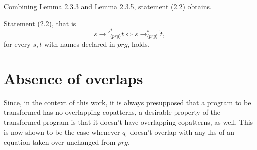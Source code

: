 Combining Lemma 2.3.3 and Lemma 2.3.5, statement (2.2) obtains.
\begin{proposition}
Statement (2.2), that is
\[
s {\longrightarrow'}_{\langle prg \rangle}^* t \iff s \longrightarrow^*_{\langle prg \rangle} \widetilde{t},
\]
for every $s, t$ with names declared in $prg$, holds.
\end{proposition}

\section{Absence of overlaps}

Since, in the context of this work, it is always presupposed that a program to be transformed has no overlapping copatterns, a desirable property of the transformed program is that it doesn't have overlapping copatterns, as well. This is now shown to be the case whenever $q_\epsilon$ doesn't overlap with any lhs of an equation taken over unchanged from $prg$.

